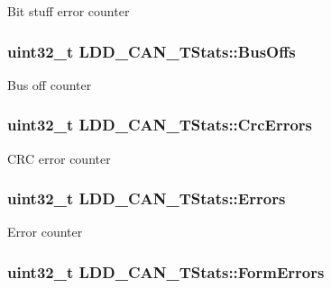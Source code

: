 Bit stuff error counter \hypertarget{struct_l_d_d___c_a_n___t_stats_aa01ae74140765599c87675e5df7d8a3d}{
\subsubsection[{Bus\-Offs}]{\setlength{\rightskip}{0pt plus 5cm}uint32\-\_\-t L\-D\-D\-\_\-\-C\-A\-N\-\_\-\-T\-Stats\-::\-Bus\-Offs}}\label{struct_l_d_d___c_a_n___t_stats_aa01ae74140765599c87675e5df7d8a3d}
Bus off counter \hypertarget{struct_l_d_d___c_a_n___t_stats_a27e16f4ddc9cdf544026c4d6ce7b698f}{
\subsubsection[{Crc\-Errors}]{\setlength{\rightskip}{0pt plus 5cm}uint32\-\_\-t L\-D\-D\-\_\-\-C\-A\-N\-\_\-\-T\-Stats\-::\-Crc\-Errors}}\label{struct_l_d_d___c_a_n___t_stats_a27e16f4ddc9cdf544026c4d6ce7b698f}
C\-R\-C error counter \hypertarget{struct_l_d_d___c_a_n___t_stats_a9540270ab882bd0afa615b87afb9e6b3}{
\subsubsection[{Errors}]{\setlength{\rightskip}{0pt plus 5cm}uint32\-\_\-t L\-D\-D\-\_\-\-C\-A\-N\-\_\-\-T\-Stats\-::\-Errors}}\label{struct_l_d_d___c_a_n___t_stats_a9540270ab882bd0afa615b87afb9e6b3}
Error counter \hypertarget{struct_l_d_d___c_a_n___t_stats_a0d783d7e8813ded41cdac8181bab524a}{
\subsubsection[{Form\-Errors}]{\setlength{\rightskip}{0pt plus 5cm}uint32\-\_\-t L\-D\-D\-\_\-\-C\-A\-N\-\_\-\-T\-Stats\-::\-Form\-Errors}}\label{struct_l_d_d___c_a_n___t_stats_a0d783d7e8813ded41cdac8181bab524a}
